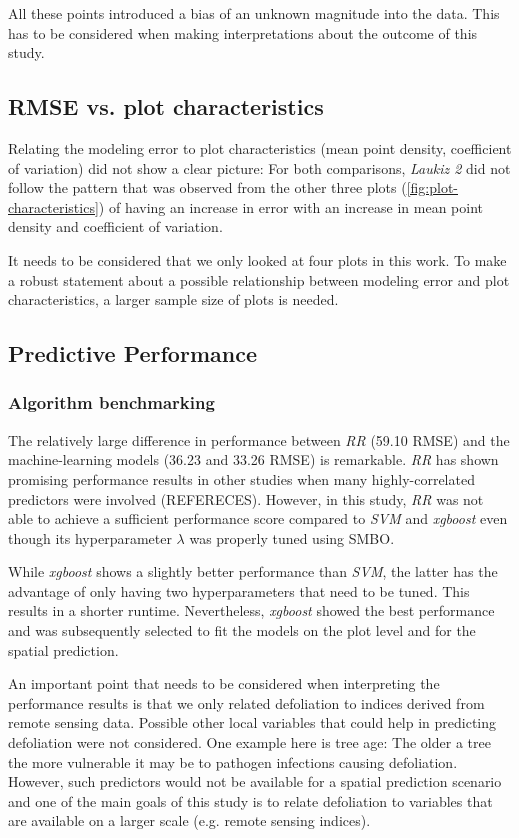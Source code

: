 \documentclass[review]{elsarticle}
\begin{document}
All these points introduced a bias of an unknown magnitude into the data.
This has to be considered when making interpretations about the outcome of this study.

\subsection{RMSE vs. plot characteristics}

\noindent Relating the modeling error to plot characteristics (mean point density, coefficient of variation) did not show a clear picture: For both comparisons, \textit{Laukiz 2} did not follow the pattern that was observed from the other three plots (\autoref{fig:plot-characteristics}) of having an increase in error with an increase in mean point density and coefficient of variation.

It needs to be considered that we only looked at four plots in this work.
To make a robust statement about a possible relationship between modeling error and plot characteristics, a larger sample size of plots is needed.

\subsection{Predictive Performance}

\subsubsection{Algorithm benchmarking}

\noindent The relatively large difference in performance between \textit{RR} (59.10 RMSE) and the machine-learning models (36.23 and 33.26 RMSE) is remarkable.
\textit{RR} has shown promising performance results in other studies when many highly-correlated predictors were involved (REFERECES).
However, in this study, \textit{RR} was not able to achieve a sufficient performance score compared to \textit{SVM} and \textit{xgboost} even though its hyperparameter $\lambda$ was properly tuned using SMBO.

While \textit{xgboost} shows a slightly better performance than \textit{SVM}, the latter has the advantage of only having two hyperparameters that need to be tuned.
This results in a shorter runtime.
Nevertheless, \textit{xgboost} showed the best performance and was subsequently selected to fit the models on the plot level and for the spatial prediction.

An important point that needs to be considered when interpreting the performance results is that we only related defoliation to indices derived from remote sensing data.
Possible other local variables that could help in predicting defoliation were not considered.
One example here is tree age: The older a tree the more vulnerable it may be to pathogen infections causing defoliation.
However, such predictors would not be available for a spatial prediction scenario and one of the main goals of this study is to relate defoliation to variables that are available on a larger scale (e.g. remote sensing indices).
\end{document}
